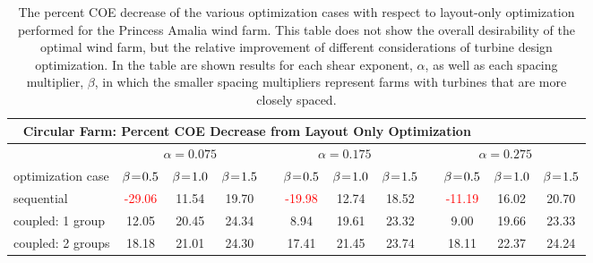 \begin{center}
\begin{table}
\caption{The percent COE decrease of the various optimization cases with respect to layout-only optimization performed for the Princess Amalia wind farm. This table does not show the overall desirability of the optimal wind farm, but the relative improvement of different considerations of turbine design optimization. In the table are shown results for each shear exponent, $\alpha$, as well as each spacing multiplier, $\beta$, in which the smaller spacing multipliers represent farms with turbines that are more closely spaced.}
\label{circular_table}
\begin{tabular}{p{2.5cm} c c c c c c c c c c c}
\hline
\multicolumn{10}{c}{\textbf{Circular Farm: Percent COE Decrease from Layout Only Optimization}}\\
\hline
 & \multicolumn{3}{c}{$\alpha=0.075$} & \multicolumn{4}{c}{$\alpha=0.175$} & \multicolumn{4}{c}{$\alpha=0.275$}\\
\hline
optimization case & $\beta\mkern1.5mu{=}\mkern1.5mu0.5$ & $\beta\mkern1.5mu{=}\mkern1.5mu1.0$ & $\beta\mkern1.5mu{=}\mkern1.5mu1.5$ & & $\beta\mkern1.5mu{=}\mkern1.5mu0.5$ & $\beta\mkern1.5mu{=}\mkern1.5mu1.0$ & $\beta\mkern1.5mu{=}\mkern1.5mu1.5$& &$\beta\mkern1.5mu{=}\mkern1.5mu0.5$ & $\beta\mkern1.5mu{=}\mkern1.5mu1.0$ & $\beta\mkern1.5mu{=}\mkern1.5mu1.5$\\
sequential & \textcolor{red}{-29.06} & 11.54 & 19.70 & & \textcolor{red}{-19.98}  & 12.74 & 18.52 & & \textcolor{red}{-11.19}  & 16.02 & 20.70\\
coupled: 1 group& 12.05  & 20.45  & 24.34  & & 8.94  & 19.61  & 23.32 & & 9.00 & 19.66 & 23.33 \\
coupled: 2 groups & 18.18  & 21.01  & 24.30 & & 17.41  & 21.45  &  23.74 & &  18.11 & 22.37  & 24.24\\
\hline
\end{tabular}
\end{table}
\end{center}



